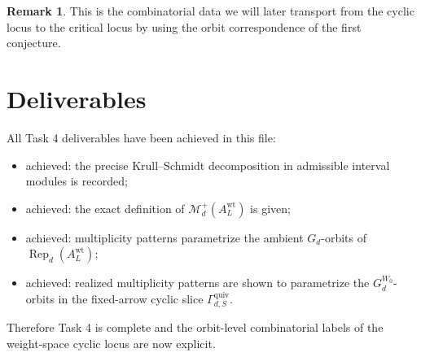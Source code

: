 \documentclass{article}
\newcommand{\Rep}{\operatorname{Rep}}
\theoremstyle{definition}
\newtheorem{remark}[theorem]{Remark}
\begin{document}
\begin{remark}
This is the combinatorial data we will later transport from the cyclic locus
to the critical locus by using the orbit correspondence of the first
conjecture.
\end{remark}

\section{Deliverables}

All Task 4 deliverables have been achieved in this file:

\begin{itemize}
\item achieved: the precise Krull--Schmidt decomposition in admissible interval
  modules is recorded;
\item achieved: the exact definition of $\mathcal M_d^+(A_L^{\mathrm{wt}})$ is
  given;
\item achieved: multiplicity patterns parametrize the ambient $G_d$-orbits of
  $\Rep_d(A_L^{\mathrm{wt}})$;
\item achieved: realized multiplicity patterns are shown to parametrize the
  $G_d^{W_0}$-orbits in the fixed-arrow cyclic slice
  $\Gamma_{d,S}^{\mathrm{quiv}}$.
\end{itemize}

Therefore Task 4 is complete and the orbit-level combinatorial labels of the
weight-space cyclic locus are now explicit.
\end{document}
